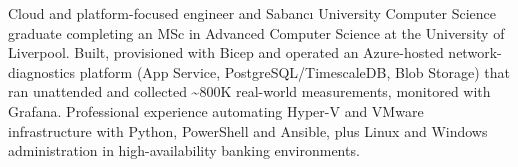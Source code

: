 



Cloud and platform-focused engineer and Sabancı University Computer Science graduate completing an MSc in Advanced Computer Science at the University of Liverpool. Built, provisioned with Bicep and operated an Azure-hosted network-diagnostics platform (App Service, PostgreSQL/TimescaleDB, Blob Storage) that ran unattended and collected \textasciitilde 800K real-world measurements, monitored with Grafana. Professional experience automating Hyper-V and VMware infrastructure with Python, PowerShell and Ansible, plus Linux and Windows administration in high-availability banking environments.




